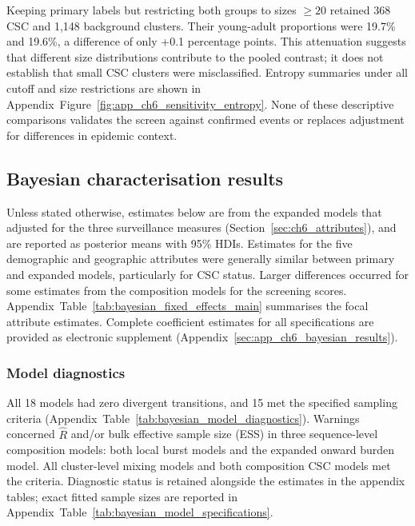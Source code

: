 Keeping primary labels but restricting both groups to sizes $\geq20$ retained 368 CSC and 1,148 background clusters. Their young-adult proportions were 19.7\% and 19.6\%, a difference of only +0.1 percentage points. This attenuation suggests that different size distributions contribute to the pooled contrast; it does not establish that small CSC clusters were misclassified. Entropy summaries under all cutoff and size restrictions are shown in Appendix~Figure~\ref{fig:app_ch6_sensitivity_entropy}. None of these descriptive comparisons validates the screen against confirmed events or replaces adjustment for differences in epidemic context.

\subsection{Bayesian characterisation results}\label{sec:ch6_bayesian_results}

Unless stated otherwise, estimates below are from the expanded models that adjusted for the three surveillance measures (Section~\ref{sec:ch6_attributes}), and are reported as posterior means with 95\% HDIs. Estimates for the five demographic and geographic attributes were generally similar between primary and expanded models, particularly for CSC status. Larger differences occurred for some estimates from the composition models for the screening scores. Appendix~Table~\ref{tab:bayesian_fixed_effects_main} summarises the focal attribute estimates. Complete coefficient estimates for all specifications are provided as electronic supplement (Appendix~\ref{sec:app_ch6_bayesian_results}).

\subsubsection*{Model diagnostics}\label{sec:ch6_model_diagnostics}

All 18 models had zero divergent transitions, and 15 met the specified sampling criteria (Appendix~Table~\ref{tab:bayesian_model_diagnostics}). Warnings concerned $\widehat R$ and/or bulk effective sample size (ESS) in three sequence-level composition models: both local burst models and the expanded onward burden model. All cluster-level mixing models and both composition CSC models met the criteria. Diagnostic status is retained alongside the estimates in the appendix tables; exact fitted sample sizes are reported in Appendix~Table~\ref{tab:bayesian_model_specifications}.

